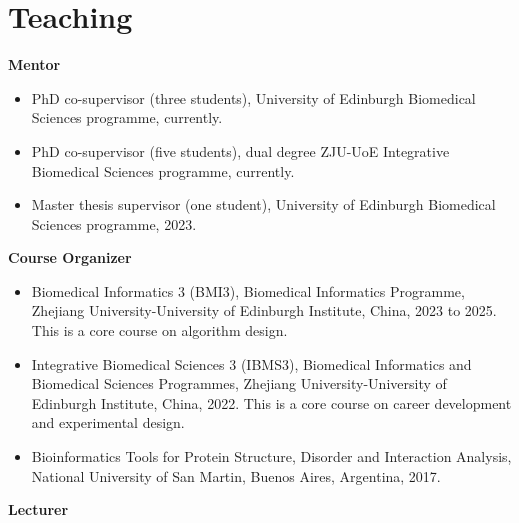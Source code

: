 \documentclass[11pt,a4paper,sans]{moderncv} %
\begin{document}
\section{Teaching}
\vspace{0.1cm}
\textbf{Mentor}
\begin{itemize}
  \item PhD co-supervisor (three students), University of Edinburgh Biomedical Sciences programme, currently.
  \item PhD co-supervisor (five students), dual degree ZJU-UoE Integrative Biomedical Sciences programme, currently.
  \item Master thesis supervisor (one student), University of Edinburgh Biomedical Sciences programme, 2023.
\end{itemize}
\vspace{0.1cm}
\textbf{Course Organizer}
\begin{itemize}
  \item Biomedical Informatics 3 (BMI3), Biomedical Informatics Programme, Zhejiang University-University of Edinburgh Institute, China, 2023 to 2025. This is a core course on algorithm design.
  \item Integrative Biomedical Sciences 3 (IBMS3), Biomedical Informatics and Biomedical Sciences Programmes, Zhejiang University-University of Edinburgh Institute, China, 2022. This is a core course on career development and experimental design.
  \item Bioinformatics Tools for Protein Structure, Disorder and Interaction Analysis, National University of San Martin, Buenos Aires, Argentina, 2017.
\end{itemize}
\vspace{0.1cm}
\textbf{Lecturer}
\end{document}
